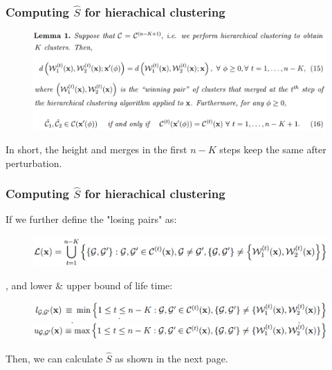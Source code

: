 \documentclass{beamer}
\begin{document}
	\begin{frame}
		\frametitle{Computing $\hat{S}$ for hierachical clustering}
		\begin{figure}
			\includegraphics[width=1\linewidth]{image013.png}
		\end{figure}
		In short, the height and merges in the first $n-K$ steps keep the same after perturbation.
	\end{frame}
	
	\begin{frame}
		\frametitle{Computing $\hat{S}$ for hierachical clustering}
		If we further define the "losing pairs" as:
		\begin{figure}
			\includegraphics[width=1\linewidth]{image016.png}
		\end{figure}
		, and lower \& upper bound of life time:
		\begin{figure}
			\includegraphics[width=1\linewidth]{image017.png}
			\includegraphics[width=1\linewidth]{image018.png}
		\end{figure}
		Then, we can calculate $\hat{S}$ as shown in the next page.
	\end{frame}
	
\end{document}
